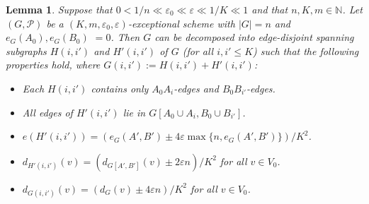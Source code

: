 \documentclass{memo-l}
\newtheorem{lemma}[firstthm]{Lemma}
\def\eps{\varepsilon}
\def\epszero{\eps_0}
\numberwithin{section}{chapter}
\numberwithin{equation}{section}
\numberwithin{firstthm}{section}
\numberwithin{figure}{section}
\begin{document}
\begin{lemma} \label{lma:randomslice}
Suppose that $0 <  1/n  \ll \epszero \ll  \eps  \ll 1/K \ll 1$ and that $n, K,m\in \mathbb{N}$.
Let $(G, \mathcal{P})$ be a $(K, m, \epszero, \eps )$-exceptional scheme with $|G|=n$ and $e_G(A_0),e_G(B_0)$  $=0$.
Then $G$ can be decomposed into edge-disjoint spanning subgraphs $H(i,i')$ and $H'(i,i')$ of $G$ (for all $i,i' \le K$)
such that the following properties hold, where $G(i,i'):=H(i,i')+H'(i,i')$:
\begin{itemize}
\item[$(a_1)$] Each $H(i,i')$ contains only $A_0A_i$-edges and $B_0B_{i'}$-edges.
\item[$(a_2)$] All edges of $H'(i,i')$ lie in $G[A_0 \cup A_i, B_0 \cup B_{i'}]$.
\item[$(a_3)$] $e ( H'(i,i') )   =  ( e_{G}(A',B')  \pm  4 \eps \max \{ n, e_{G}(A',B') \}) /K^2$.
\item[$(a_4)$] $d_{H'(i,i')}(v )  =  ( d_{G[A',B']}(v)  \pm 2\eps n)/K^2$ for all $v \in V_0$.
\item[$(a_5)$] $d_{G(i,i')}(v )  =  ( d_{G}(v)  \pm 4 \eps n)/K^2$ for all $v \in V_0$.
\end{itemize}
\end{lemma}
\end{document}
